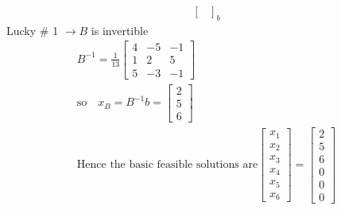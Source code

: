 \begin{definition-N}
\begin{example-N}
\begin{gather*}
{\begin{bmatrix}
			\end{bmatrix}}_{b}
		\end{gather*}
		Lucky \# 1 $\rightarrow B$ is invertible
		\begin{gather*}
			B^{-1} = \frac{1}{13} \begin{bmatrix}
				4 & -5 & -1\\
				1 & 2 & 5\\
				5 & -3 & -1
			\end{bmatrix}\\
			\text{so} \quad x_B = B^{-1}b = \begin{bmatrix}
				2\\5\\6
			\end{bmatrix}\\
			\text{Hence the basic feasible solutions are} \begin{bmatrix}
				x_1\\x_2\\x_3\\x_4\\x_5\\x_6
			\end{bmatrix} = \begin{bmatrix}
				2\\5\\6\\0\\0\\0
			\end{bmatrix}
		\end{gather*}
	\end{example-N}
\end{definition-N}